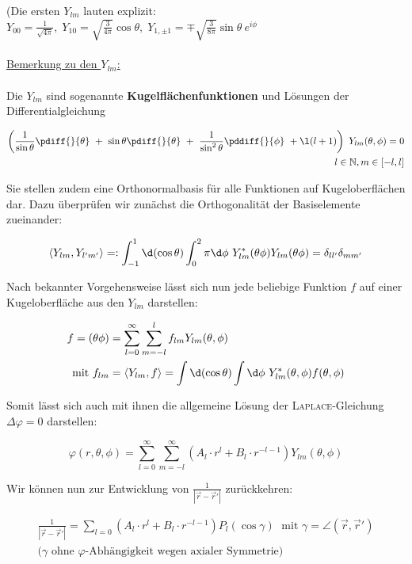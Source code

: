 (Die ersten $Y_{lm}$ lauten explizit: $Y_{00} = \frac{1}{\sqrt{4\pi}}, \; Y_{10} = \sqrt{\frac{3}{4\pi}}\cos\theta, \; Y_{1,\pm1} = \mp \sqrt{\frac{3}{8\pi}}\sin\theta \ e^{i\phi}$\
\\
\ \\
\underline{Bemerkung zu den $Y_{lm}$:}\
\\
\ \\
Die $Y_{lm}$ sind sogenannte \textbf{Kugelflächenfunktionen} und Lösungen der Differentialgleichung

\begin{align*}
\left(\frac{1}{\sin\theta}\pdiff{}{\theta} \ + \ \sin\theta \pdiff{}{\theta} \ + \ \frac{1}{\sin^2\theta} \pddiff{}{\phi} \ + \l(l+1)\right) \ Y_{lm}(\theta,\phi) = 0\\
l \in \mathbb{N}, m \in [-l,l]
\end{align*}

Sie stellen zudem eine Orthonormalbasis für alle Funktionen auf Kugeloberflächen dar. Dazu überprüfen wir zunächst die Orthogonalität der Basiselemente zueinander:

\begin{equation*}
\langle Y_{lm},Y_{l'm'}\rangle =: \int_{-1}^1\d(\cos\theta)\int_{0}^2\pi\d\phi \ Y^{*}_{lm}(\theta\phi) Y_{lm}(\theta\phi) = \delta_{ll'}\delta_{mm'}
\end{equation*}

Nach bekannter Vorgehensweise lässt sich nun jede beliebige Funktion $f$ auf einer Kugeloberfläche aus den $Y_{lm}$ darstellen:

\begin{align*}
f = (\theta\phi) &= \sum_{l=0}^{\infty} \sum_{m=-l}^{l} f_{lm} Y_{lm}(\theta,\phi)\\
\text{mit } f_{lm} &= \langle Y_{lm},f\rangle = \int\d(\cos\theta) \int\d\phi \ Y^{*}_{lm}(\theta,\phi)f(\theta,\phi)
\end{align*}

Somit lässt sich auch mit ihnen die allgemeine Lösung der \textsc{Laplace}-Gleichung $\Delta\varphi=0$ darstellen: 

\begin{equation*}
\varphi(r,\theta,\phi) = \sum_{l=0}^{\infty}\sum_{m=-l}^{\infty} \left(A_l \cdot r^l + B_l \cdot r^{-l-1}\right) Y_{lm}(\theta,\phi)
\end{equation*}

Wir können nun zur Entwicklung von $\frac{1}{|\vec{r} - \vec{r}'|}$ zurückkehren:

\begin{align*}
\frac{1}{|\vec{r} - \vec{r}'|} = \sum_{l=0} \left(A_l \cdot r^l + B_l \cdot r^{-l-1}\right) P_l(\cos\gamma) \; \text{ mit } \gamma = \angle\left(\vec{r},\vec{r}'\right)\\
(\gamma\text{ ohne $\varphi$-Abhängigkeit wegen axialer Symmetrie)}
\end{align*}

